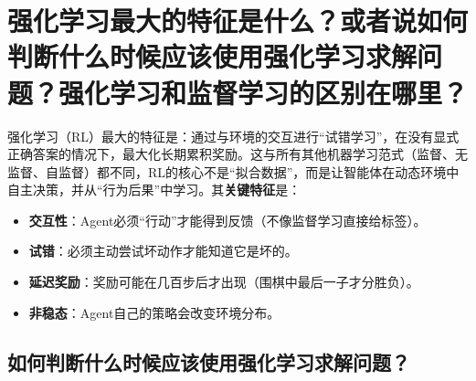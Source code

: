\documentclass[12pt,a4paper,UTF8]{ctexart}
\begin{document}
\section{强化学习最大的特征是什么？或者说如何判断什么时候应该使用强化学习求解问题？强化学习和监督学习的区别在哪里？}

强化学习（RL）最大的特征是：通过与环境的交互进行“试错学习”，在没有显式正确答案的情况下，最大化长期累积奖励。这与所有其他机器学习范式（监督、无监督、自监督）都不同，RL的核心不是“拟合数据”，而是让智能体在动态环境中自主决策，并从“行为后果”中学习。其\textbf{关键特征}是：
\begin{itemize}
    \item \textbf{交互性}：Agent必须“行动”才能得到反馈（不像监督学习直接给标签）。
    \item \textbf{试错}：必须主动尝试坏动作才能知道它是坏的。
    \item \textbf{延迟奖励}：奖励可能在几百步后才出现（围棋中最后一子才分胜负）。
    \item \textbf{非稳态}：Agent自己的策略会改变环境分布。
\end{itemize}
\subsection{如何判断什么时候应该使用强化学习求解问题？}
\end{document}
